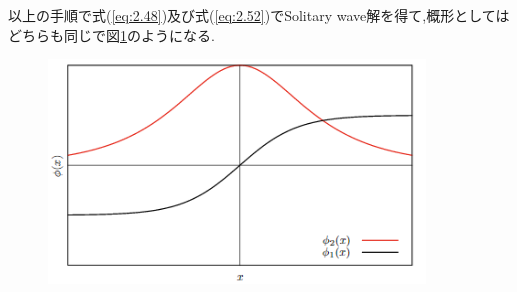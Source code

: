 \documentclass[dvipdfmx,11pt,a4paper,oneside,openany]{jsbook}
\begin{document}
以上の手順で式(\ref{eq:2.48})及び式(\ref{eq:2.52})でSolitary wave解を得て,概形としてはどちらも同じで図\ref{2-coupled-phi_typeB}のようになる.
\begin{figure}[H]
    \centering
    \includegraphics[width=10cm]{figure/2-coupled-phi_typeB.png}
    \caption{}
    \label{2-coupled-phi_typeB}
\end{figure}
\end{document}
